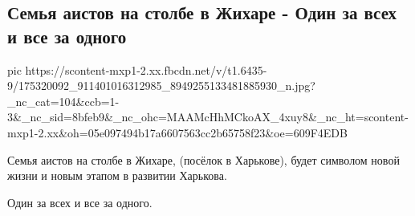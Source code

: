  
 
 
 
 
\subsection{Семья аистов на столбе в Жихаре - Один за всех и все за одного}

\ifcmt
  pic https://scontent-mxp1-2.xx.fbcdn.net/v/t1.6435-9/175320092_911401016312985_8949255133481885930_n.jpg?_nc_cat=104&ccb=1-3&_nc_sid=8bfeb9&_nc_ohc=MAAMcHhMCkoAX_4xuy8&_nc_ht=scontent-mxp1-2.xx&oh=05e097494b17a6607563cc2b65758f23&oe=609F4EDB
\fi

Семья аистов на столбе в Жихаре, (посёлок в Харькове), будет символом новой
жизни и новым этапом в развитии Харькова. 

Один за всех и все за одного.
